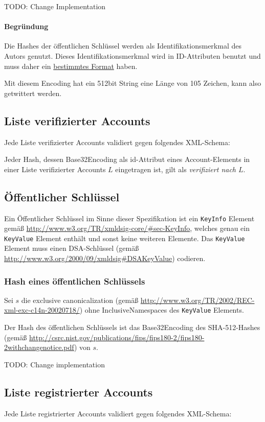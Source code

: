\documentclass[a4paper,10pt]{article}
\begin{document}
TODO: Change Implementation

\paragraph{Begründung}
Die Hashes der öffentlichen Schlüssel werden als Identifikationsmerkmal des Autors genutzt. Dieses Identifikationsmerkmal wird in ID-Attributen benutzt und muss daher ein \href{http://www.w3.org/TR/xml11/#NT-Name}{bestimmtes Format} haben.

Mit diesem Encoding hat ein 512bit String eine Länge von 105 Zeichen, kann also getwittert werden.

\subsection{Liste verifizierter Accounts}
Jede Liste verifizierter Accounts validiert gegen folgendes XML-Schema:


Jeder Hash, dessen Base32Encoding als id-Attribut eines Account-Elements in einer Liste verifizierter Accounts $L$  eingetragen ist, gilt als \emph{verifiziert nach $L$}.

\subsection{Öffentlicher Schlüssel} \label{sec:publicKey}
Ein Öffentlicher Schlüssel im Sinne dieser Spezifikation ist ein \texttt{KeyInfo} Element gemäß \url{http://www.w3.org/TR/xmldsig-core/#sec-KeyInfo}, welches genau ein \texttt{KeyValue} Element enthält und sonst keine weiteren Elemente. Das \texttt{KeyValue} Element muss einen DSA-Schlüssel (gemäß \url{http://www.w3.org/2000/09/xmldsig#DSAKeyValue}) codieren.

\subsubsection{Hash eines öffentlichen Schlüssels}
Sei $s$ die exclusive canonicalization (gemäß \url{http://www.w3.org/TR/2002/REC-xml-exc-c14n-20020718/}) ohne InclusiveNamespaces des \texttt{KeyValue} Elements.

Der Hash des öffentlichen Schlüssels ist das Base32Encoding des SHA-512-Hashes (gemäß \url{http://csrc.nist.gov/publications/fips/fips180-2/fips180-2withchangenotice.pdf}) von $s$.

TODO: Change implementation

\subsection{Liste registrierter Accounts}
Jede Liste registrierter Accounts validiert gegen folgendes XML-Schema:

\end{document}
